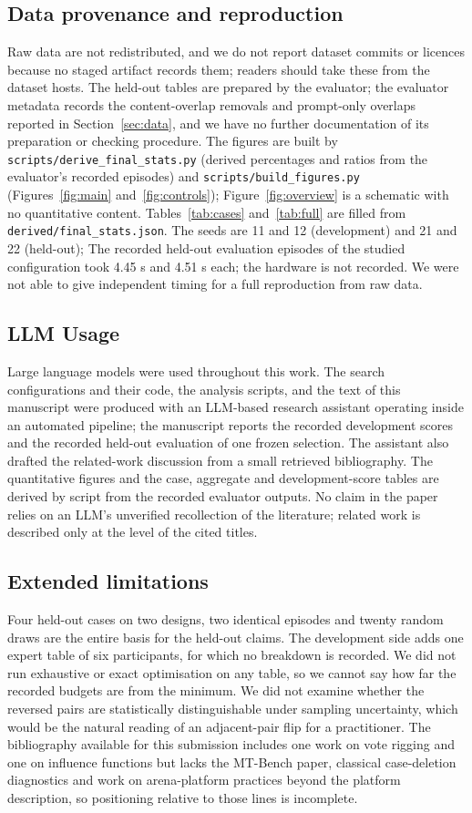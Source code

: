 \documentclass{article}
\begin{document}
\subsection{Data provenance and reproduction}
Raw data are not redistributed, and we do not report dataset commits or licences because no staged artifact records them; readers should take these from the dataset hosts. The held-out tables are prepared by the evaluator; the evaluator metadata records the content-overlap removals and prompt-only overlaps reported in Section~\ref{sec:data}, and we have no further documentation of its preparation or checking procedure. The figures are built by \texttt{scripts/derive\_final\_stats.py} (derived percentages and ratios from the evaluator's recorded episodes) and \texttt{scripts/build\_figures.py} (Figures~\ref{fig:main} and~\ref{fig:controls}); Figure~\ref{fig:overview} is a schematic with no quantitative content. Tables~\ref{tab:cases} and~\ref{tab:full} are filled from \texttt{derived/final\_stats.json}. The seeds are 11 and 12 (development) and 21 and 22 (held-out); The recorded held-out evaluation episodes of the studied configuration took 4.45 s and 4.51 s each; the hardware is not recorded. We were not able to give independent timing for a full reproduction from raw data.

\subsection{LLM Usage}
Large language models were used throughout this work. The search configurations and their code, the analysis scripts, and the text of this manuscript were produced with an LLM-based research assistant operating inside an automated pipeline; the manuscript reports the recorded development scores and the recorded held-out evaluation of one frozen selection. The assistant also drafted the related-work discussion from a small retrieved bibliography. The quantitative figures and the case, aggregate and development-score tables are derived by script from the recorded evaluator outputs. No claim in the paper relies on an LLM's unverified recollection of the literature; related work is described only at the level of the cited titles.

\subsection{Extended limitations}
Four held-out cases on two designs, two identical episodes and twenty random draws are the entire basis for the held-out claims. The development side adds one expert table of six participants, for which no breakdown is recorded. We did not run exhaustive or exact optimisation on any table, so we cannot say how far the recorded budgets are from the minimum. We did not examine whether the reversed pairs are statistically distinguishable under sampling uncertainty, which would be the natural reading of an adjacent-pair flip for a practitioner. The bibliography available for this submission includes one work on vote rigging and one on influence functions but lacks the MT-Bench paper, classical case-deletion diagnostics and work on arena-platform practices beyond the platform description, so positioning relative to those lines is incomplete.
\end{document}
